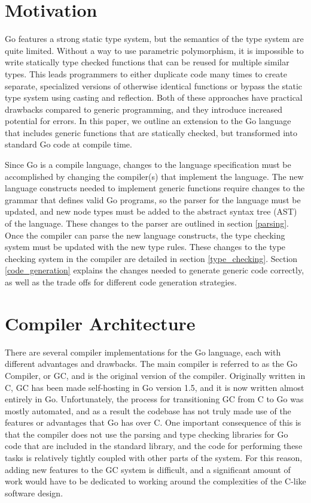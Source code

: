 \documentclass[letterpaper,twocolumn,10pt]{article}
\begin{document}
\section{Motivation} \label{motivation}

Go features a strong static type system, but the semantics of the type system are quite limited. Without a way to use parametric polymorphism, it is impossible to write statically type checked functions that can be reused for multiple similar types. This leads programmers to either duplicate code many times to create separate, specialized versions of otherwise identical functions or bypass the static type system using casting and reflection. Both of these approaches have practical drawbacks compared to generic programming, and they introduce increased potential for errors. In this paper, we outline an extension to the Go language that includes generic functions that are statically checked, but transformed into standard Go code at compile time. 

Since Go is a compile language, changes to the language specification must be accomplished by changing the compiler(s) that implement the language. The new language constructs needed to implement generic functions require changes to the grammar that defines valid Go programs, so the parser for the language must be updated, and new node types must be added to the abstract syntax tree (AST) of the language. These changes to the parser are outlined in section \ref{parsing}. Once the compiler can parse the new language constructs, the type checking system must be updated with the new type rules. These changes to the type checking system in the compiler are detailed in section \ref{type_checking}. Section \ref{code_generation} explains the changes needed to generate generic code correctly, as well as the trade offs for different code generation strategies. 

\section{Compiler Architecture} \label{architecture}

There are several compiler implementations for the Go language, each with different advantages and drawbacks. The main compiler is referred to as the Go Compiler, or GC, and is the original version of the compiler. Originally written in C, GC has been made self-hosting in Go version 1.5, and it is now written almost entirely in Go. Unfortunately, the process for transitioning GC from C to Go was mostly automated, and as a result the codebase has not truly made use of the features or advantages that Go has over C. One important consequence of this is that the compiler does not use the parsing and type checking libraries for Go code that are included in the standard library, and the code for performing these tasks is relatively tightly coupled with other parts of the system. For this reason, adding new features to the GC system is difficult, and a significant amount of work would have to be dedicated to working around the complexities of the C-like software design.
\end{document}
